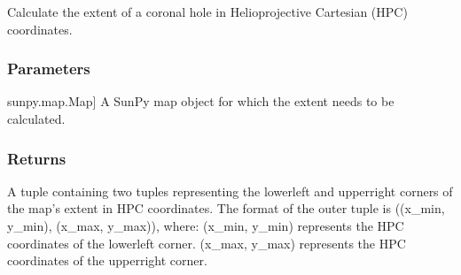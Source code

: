 \documentclass[letterpaper,10pt,english]{sphinxmanual}
\begin{document}

\begin{fulllineitems}
\label{\detokenize{pycatch/utils/extensions:pycatch.utils.extensions.get_extent}}
\pysigstartsignatures
{}
\pysigstopsignatures
\sphinxAtStartPar
Calculate the extent of a coronal hole in Helioprojective Cartesian (HPC) coordinates.


\subsubsection{Parameters}
\label{\detokenize{pycatch/utils/extensions:id3}}\begin{description}
\sphinxlineitem{map}{[}sunpy.map.Map{]}
\sphinxAtStartPar
A SunPy map object for which the extent needs to be calculated.

\end{description}


\subsubsection{Returns}
\label{\detokenize{pycatch/utils/extensions:id4}}\begin{description}
\sphinxAtStartPar
A tuple containing two tuples representing the lower\sphinxhyphen{}left and upper\sphinxhyphen{}right corners of the map’s extent in HPC coordinates.
The format of the outer tuple is ((x\_min, y\_min), (x\_max, y\_max)), where:
(x\_min, y\_min) represents the HPC coordinates of the lower\sphinxhyphen{}left corner.
(x\_max, y\_max) represents the HPC coordinates of the upper\sphinxhyphen{}right corner.

\end{description}

\end{fulllineitems}

\end{document}

